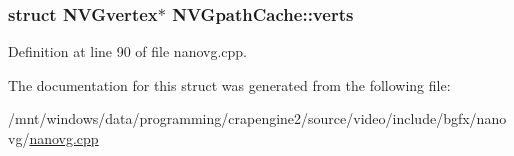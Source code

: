 \hypertarget{struct_n_v_gpath_cache_a2f6986b4b0e13acbd9f98b67d34a8d16}{
\subsubsection[{verts}]{\setlength{\rightskip}{0pt plus 5cm}struct {\bf N\+V\+Gvertex}$\ast$ N\+V\+Gpath\+Cache\+::verts}}\label{struct_n_v_gpath_cache_a2f6986b4b0e13acbd9f98b67d34a8d16}


Definition at line 90 of file nanovg.\+cpp.



The documentation for this struct was generated from the following file\+:\begin{DoxyCompactItemize}
\item 
/mnt/windows/data/programming/crapengine2/source/video/include/bgfx/nanovg/\hyperlink{nanovg_8cpp}{nanovg.\+cpp}\end{DoxyCompactItemize}
